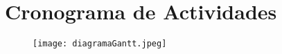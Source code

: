 \section{Cronograma de Actividades}

    \begin{figure}[H]
        \centering
        \texttt{[image: diagramaGantt.jpeg]}
        \label{fig:fig8}
    \end{figure}
